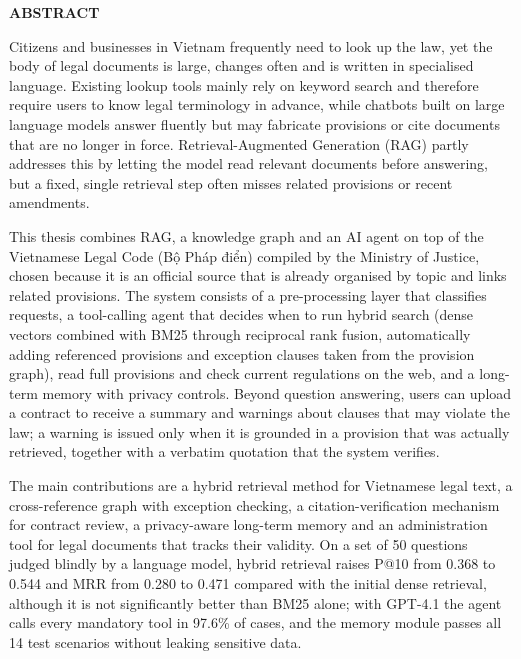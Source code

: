 \documentclass[../DoAn.tex]{subfiles}
\begin{document}
\begin{center}
    \Large{\textbf{ABSTRACT}}\\
\end{center}
\vspace{1cm}
Citizens and businesses in Vietnam frequently need to look up the law, yet the body of legal documents is large, changes often and is written in specialised language. Existing lookup tools mainly rely on keyword search and therefore require users to know legal terminology in advance, while chatbots built on large language models answer fluently but may fabricate provisions or cite documents that are no longer in force. Retrieval-Augmented Generation (RAG) partly addresses this by letting the model read relevant documents before answering, but a fixed, single retrieval step often misses related provisions or recent amendments.

This thesis combines RAG, a knowledge graph and an AI agent on top of the Vietnamese Legal Code (Bộ Pháp điển) compiled by the Ministry of Justice, chosen because it is an official source that is already organised by topic and links related provisions. The system consists of a pre-processing layer that classifies requests, a tool-calling agent that decides when to run hybrid search (dense vectors combined with BM25 through reciprocal rank fusion, automatically adding referenced provisions and exception clauses taken from the provision graph), read full provisions and check current regulations on the web, and a long-term memory with privacy controls. Beyond question answering, users can upload a contract to receive a summary and warnings about clauses that may violate the law; a warning is issued only when it is grounded in a provision that was actually retrieved, together with a verbatim quotation that the system verifies.

The main contributions are a hybrid retrieval method for Vietnamese legal text, a cross-reference graph with exception checking, a citation-verification mechanism for contract review, a privacy-aware long-term memory and an administration tool for legal documents that tracks their validity. On a set of 50 questions judged blindly by a language model, hybrid retrieval raises P@10 from 0.368 to 0.544 and MRR from 0.280 to 0.471 compared with the initial dense retrieval, although it is not significantly better than BM25 alone; with GPT-4.1 the agent calls every mandatory tool in 97.6\% of cases, and the memory module passes all 14 test scenarios without leaking sensitive data.
\end{document}
